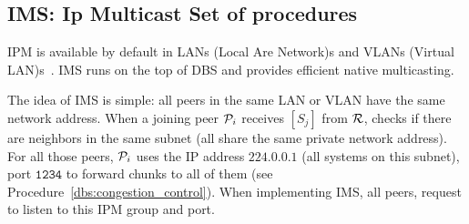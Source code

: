 \subsection{IMS: Ip Multicast Set of procedures}
\label{sec:IMS}
IPM is available by default in LANs (Local Are Network)s and VLANs
(Virtual LAN)s~\cite{shabtay2011ip}. IMS runs on the top of DBS and
provides efficient native multicasting.

The idea of IMS is simple: all peers in the same LAN or VLAN have the
same network address. When a joining peer ${\cal P}_i$ receives
$[S_j]$ from ${\cal R}$, checks if there are neighbors in the same
subnet (all share the same private network address). For all those
peers, ${\cal P}_i$ uses the IP address $\mathtt{224.0.0.1}$ (all
systems on this subnet), port $\mathtt{1234}$ to forward chunks to all
of them (see Procedure~\ref{dbs:congestion_control}). When
implementing IMS, all peers, request to listen to this IPM group and
port.

